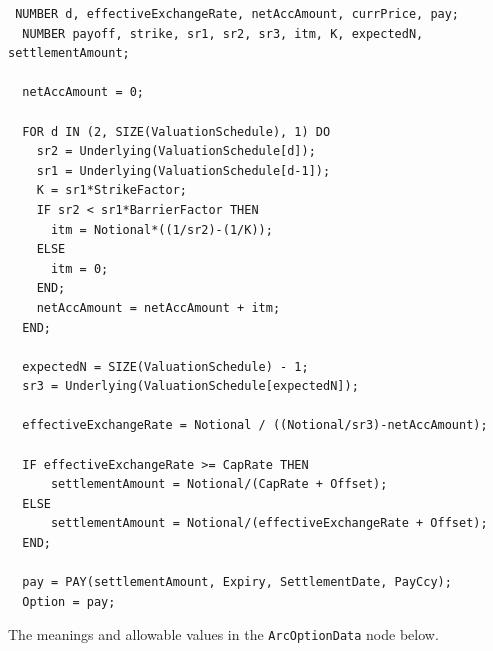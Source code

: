 \begin{listing}[hbt]
\begin{verbatim}
 NUMBER d, effectiveExchangeRate, netAccAmount, currPrice, pay;
  NUMBER payoff, strike, sr1, sr2, sr3, itm, K, expectedN, settlementAmount;

  netAccAmount = 0;

  FOR d IN (2, SIZE(ValuationSchedule), 1) DO
    sr2 = Underlying(ValuationSchedule[d]);
    sr1 = Underlying(ValuationSchedule[d-1]);
    K = sr1*StrikeFactor;
    IF sr2 < sr1*BarrierFactor THEN
      itm = Notional*((1/sr2)-(1/K));
    ELSE
      itm = 0;
    END;
    netAccAmount = netAccAmount + itm;
  END;

  expectedN = SIZE(ValuationSchedule) - 1;
  sr3 = Underlying(ValuationSchedule[expectedN]);

  effectiveExchangeRate = Notional / ((Notional/sr3)-netAccAmount);

  IF effectiveExchangeRate >= CapRate THEN
      settlementAmount = Notional/(CapRate + Offset);
  ELSE
      settlementAmount = Notional/(effectiveExchangeRate + Offset);
  END;

  pay = PAY(settlementAmount, Expiry, SettlementDate, PayCcy);
  Option = pay;
\end{verbatim}
\caption{Payoff script for an Arc Option.}
\label{lst:arc_option}
\end{listing}

The meanings and allowable values in the \lstinline!ArcOptionData! node below.

